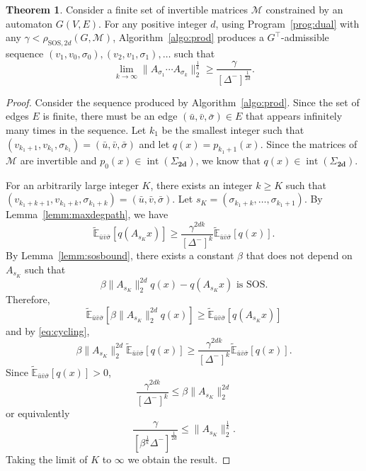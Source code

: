 \documentclass{sig-alternate-05-2015}
\DeclareMathOperator{\inte}{int}
\newcommand{\1}{\mathbf{1}}
\newcommand{\Sh}{\Sigma_{\mathbf{2d}}}
\newcommand{\mdin}{\Delta^{-}}
\theoremstyle{definition}
\newtheorem{mytheo}{Theorem}
\newcommand{\Tr}{\top}
\newcommand{\A}{\mathcal{M}}
\newcommand{\G}{G}
\newcommand{\jsrsos}[1][2d]{\rho_{\mathrm{SOS},#1}(\G,\A)}
\newcommand{\pE}{\widetilde{\mathbb{E}}}
\newcommand{\Nodes}{V}
\newcommand{\Arcs}{E}
\newcommand{\arc}{edge}
\newcommand{\arcs}{edges}
\newcommand{\defAGie  }{a finite set of invertible matrices $\A$ constrained by an automaton $\G(\Nodes,\Arcs)$}
\begin{document}
\begin{mytheo}
  \label{theo:third}
  Consider \defAGie{}.
  For any positive integer $d$,
  using Program~\ref{prog:dual} with any $\gamma < \jsrsos$,
  Algorithm~\ref{algo:prod} produces a $\G^\Tr $-admissible sequence
  $(v_1,v_0,\sigma_0),\allowbreak(v_2,v_1,\sigma_1), \ldots$ %
  such that
  \begin{equation}
    \lim_{k \to \infty} \|A_{\sigma_1} \cdots A_{\sigma_k}\|_2^{\frac{1}{k}} \geq \frac{\gamma}{[\mdin]^{\frac{1}{2d}}}.
  \end{equation}
  \begin{proof}
    Consider the sequence produced by Algorithm~\ref{algo:prod}.
    Since the set of \arcs{} $\Arcs$ is finite,
    there must be an \arc{} $(\bar{u},\bar{v},\bar{\sigma}) \in \Arcs$ that appears infinitely many times in the sequence.
    Let $k_1$ be the smallest integer such that $(v_{k_1+1},v_{k_1},\sigma_{k_1}) = (\bar{u},\bar{v},\bar{\sigma})$ and
    let $q(x) = p_{k_1+1}(x)$.
    Since the matrices of $\A$ are invertible and $p_0(x) \in \inte(\Sh)$, we know that $q(x) \in \inte(\Sh)$.

    For an arbitrarily large integer $K$, there exists an integer $k \geq K$ such that $(v_{k_1+k+1},v_{k_1+k}, \sigma_{k_1+k}) = (\bar{u},\bar{v},\bar{\sigma})$.
    Let $s_K = (\sigma_{k_1+k}, \ldots, \sigma_{k_1+1})$.
    By Lemma~\ref{lemm:maxdegpath}, we have
    \begin{equation}
      \label{eq:cycling}
      \pE_{\bar{u}\bar{v}\bar{\sigma}}[q(A_{s_K} x)] \geq \frac{\gamma^{2dk}}{[\mdin]^{k}} \pE_{\bar{u}\bar{v}\bar{\sigma}}[q(x)].
    \end{equation}
    By Lemma~\ref{lemm:sosbound}, there exists a constant $\beta$ that does not depend on $A_{s_K}$ such that%
    \[ \beta \|A_{s_K}\|_2^{2d}q(x) - q(A_{s_K} x) \text{ is SOS}. \]
    Therefore,
    \[ \pE_{\bar{u}\bar{v}\bar{\sigma}}[\beta \|A_{s_K}\|_2^{2d}q(x)] \geq \pE_{\bar{u}\bar{v}\bar{\sigma}}[q(A_{s_K} x)] \]
    and by \eqref{eq:cycling},
    \[ \beta \|A_{s_K}\|_2^{2d}\pE_{\bar{u}\bar{v}\bar{\sigma}}[q(x)] \geq \frac{\gamma^{2dk}}{[\mdin]^k} \pE_{\bar{u}\bar{v}\bar{\sigma}}[q(x)]. \]
    Since $\pE_{\bar{u}\bar{v}\bar{\sigma}}[q(x)] > 0$,
    \[ \frac{\gamma^{2dk}}{[\mdin]^k} \leq \beta \|A_{s_K}\|_2^{2d} \]
    or equivalently
    \[ \frac{\gamma}{[\beta^{\frac{1}{k}} \mdin]^{\frac{1}{2d}}} \leq \|A_{s_K}\|_2^{\frac{1}{k}}. \]
    Taking the limit of $K$ to $\infty$ we obtain the result.
  \end{proof}
\end{mytheo}
\end{document}
